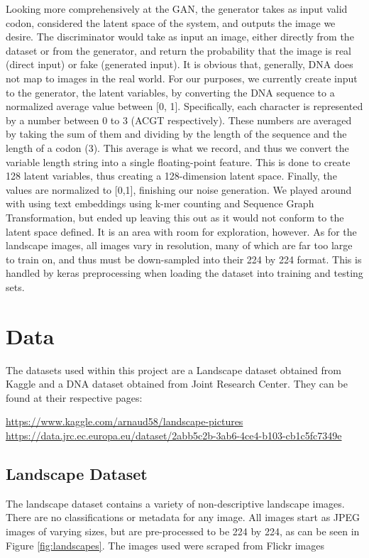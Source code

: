\documentclass{article}
\begin{document}
	Looking more comprehensively at the GAN, the generator takes as input valid codon, considered the latent space of the system, and outputs the image we desire. The discriminator would take as input an image, either directly from the dataset or from the generator, and return the probability that the image is real (direct input) or fake (generated input). It is obvious that, generally, DNA does not map to images in the real world. For our purposes, we currently create input to the generator, the latent variables, by converting the DNA sequence to a normalized average value between [0, 1]. Specifically, each character is represented by a number between 0 to 3 (ACGT respectively). These numbers are averaged by taking the sum of them and dividing by the length of the sequence and the length of a codon (3). This average is what we record, and thus we convert the variable length string into a single floating-point feature. This is done to create 128 latent variables, thus creating a 128-dimension latent space. Finally, the values are normalized to [0,1], finishing our noise generation. We played around with using text embeddings using k-mer counting and Sequence Graph Transformation, but ended up leaving this out as it would not conform to the latent space defined. It is an area with room for exploration, however. As for the landscape images, all images vary in resolution, many of which are far too large to train on, and thus must be down-sampled into their 224 by 224 format. This is handled by keras preprocessing when loading the dataset into training and testing sets. 

	
	\section{Data}
	\label{sec:data}
	The datasets used within this project are a Landscape dataset obtained from Kaggle and a DNA dataset obtained from Joint Research Center. They can be found at their respective pages:
	\begin{center}
		\url{https://www.kaggle.com/arnaud58/landscape-pictures} \\
		\url{https://data.jrc.ec.europa.eu/dataset/2abb5c2b-3ab6-4ce4-b103-cb1c5fc7349e}
	\end{center}

	\subsection{Landscape Dataset}
	The landscape dataset contains a variety of non-descriptive landscape images. There are no classifications or metadata for any image. All images start as JPEG images of varying sizes, but are pre-processed to be 224 by 224, as can be seen in Figure \ref{fig:landscapes}. The images used were scraped from Flickr images
	
\end{document}
